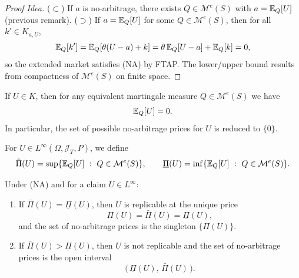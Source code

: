 \begin{proof}[Proof Idea]
($\subset$) If $a$ is no-arbitrage, there exists $Q\in\mathcal{M}^e(S)$ with $a=\mathbb{E}_Q[U]$ (previous remark).  
($\supset$) If $a=\mathbb{E}_Q[U]$ for some $Q\in\mathcal{M}^e(S)$, then for all $k'\in K_{a,U}$,
\[
\mathbb{E}_Q[k'] = \mathbb{E}_Q[\theta(U-a)+k]= \theta\,\mathbb{E}_Q[U-a]+\mathbb{E}_Q[k]=0,
\]
so the extended market satisfies (NA) by FTAP.  
The lower/upper bound results from compactness of $\mathcal{M}^e(S)$ on finite space.
\end{proof}



\begin{remark}\label{rq:UinK_implique_0}
If $U\in K$, then for any equivalent martingale measure $Q\in\mathcal{M}^e(S)$ we have
\[
\mathbb{E}_Q[U]=0.
\]
In particular, the set of possible no-arbitrage prices for $U$ is reduced to $\{0\}$.
\end{remark}

\begin{definition}
For $U\in L^\infty(\Omega,\mathcal{J}_T,P)$, we define
\begin{equation}
\bar\Pi(U)=\sup\{\E_Q[U]\ :\ Q\in\mathcal{M}^e(S)\}, \qquad
\underline{\Pi}(U)=\inf\{\E_Q[U]\ :\ Q\in\mathcal{M}^e(S)\}.
\end{equation}
\end{definition}

\begin{lemma}\label{lem:replicabilite_intervalle_prix}
Under (NA) and for a claim $U\in L^\infty$:
\begin{enumerate}
\item[(a)] If $\bar\Pi(U)=\underline{\Pi}(U)$, then $U$ is replicable at the unique price
\[
\Pi(U)=\bar\Pi(U)=\underline{\Pi}(U),
\]
and the set of no-arbitrage prices is the singleton $\{\Pi(U)\}$.
\item[(b)] If $\bar\Pi(U)>\underline{\Pi}(U)$, then $U$ is not replicable and
the set of no-arbitrage prices is the open interval
\[
\big(\,\underline{\Pi}(U),\,\bar\Pi(U)\,\big).
\]
\end{enumerate}
\end{lemma}

